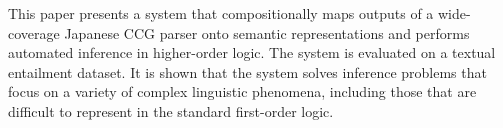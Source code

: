 This paper presents a system that compositionally maps outputs of a wide-coverage Japanese CCG parser onto semantic representations and performs automated inference in higher-order logic. The system is evaluated on a textual entailment dataset. It is shown that the system solves inference problems that focus on a variety of complex linguistic phenomena, including those that are difficult to represent in the standard first-order logic.
